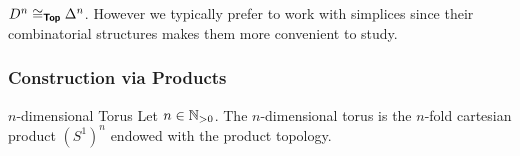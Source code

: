 \begin{remark}{}{}
    $D^{n}\cong_{\bm{\mathsf{Top}}}\Delta^{n}$. However we typically prefer to work with simplices since their combinatorial structures makes them more convenient to study.
\end{remark}

\newpage

\subsubsection{Construction via Products}

\begin{definition}{$n$-dimensional Torus}{}
    Let $n\in\mathbb{N}_{>0}$. The $n$-dimensional torus is the $n$-fold cartesian product $(S^1)^n$ endowed with the product topology.
\end{definition}

